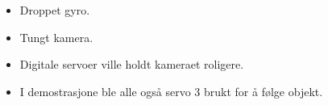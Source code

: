 \begin{itemize}
\item 
Droppet gyro.
\item 
Tungt kamera.
\item 
Digitale servoer ville holdt kameraet roligere.
\item
I demostrasjone  ble alle også servo 3 brukt for å følge objekt.
\end{itemize}

\subsection{}